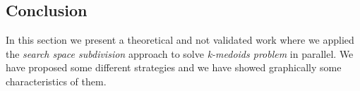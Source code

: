 %
%
%
%
%
%

\subsection{Conclusion}

In this section we present a theoretical and not validated work where we applied the {\it search space subdivision} approach to solve {\it k-medoids problem} in parallel. We have proposed some different strategies and we have showed graphically some characteristics of them. 